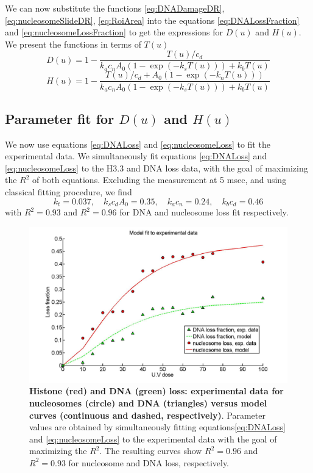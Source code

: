 \documentclass[12pt]{article}
\begin{document}
	We can now substitute the functions \eqref{eq:DNADamageDR}, \eqref{eq:nucleosomeSlideDR}, \eqref{eq:RoiArea} into the equations \eqref{eq:DNALossFraction} and \eqref{eq:nucleosomeLossFraction} to get the expressions for $D(u)$ and $H(u)$. We present the functions in terms of $T(u)$
	\begin{equation}\label{eq:DNALoss}
	D(u) = 1- \frac{T(u)/c_d}{k_ac_nA_0\left(1-\exp\left(-k_sT(u)\right)\right)+k_bT(u)} 	\end{equation}
	\begin{equation}\label{eq:nucleosomeLoss}
		H(u) = 1-\frac{T(u)/c_d+A_0\left(1-\exp\left(-k_nT(u)\right)\right)}{k_ac_nA_0\left(1-\exp\left(-k_sT(u)\right)\right)+k_bT(u)}
	\end{equation}
	
	\subsection{Parameter fit for $D(u)$ and $H(u)$}\label{subsection:parameterFit}
	We now use equations \eqref{eq:DNALoss}  and \eqref{eq:nucleosomeLoss} to fit the experimental data. We simultaneously fit equations \eqref{eq:DNALoss}  and \eqref{eq:nucleosomeLoss} to the H3.3 and DNA loss data, with the goal of maximizing the $R^2$ of both equations. Excluding the measurement at 5 msec, and using classical fitting procedure, we find
	\begin{equation*}
	k_t = 0.037, \quad k_sc_dA_0 = 0.35,\quad k_ac_n = 0.24, \quad k_bc_d = 0.46
	\end{equation*}
	with $R^2 = 0.93$ and $R^2 = 0.96$ for DNA and nucleosome loss fit respectively.
	
	
\begin{figure}[H]
\centering
\includegraphics[width=0.5\linewidth, height=0.3\textheight]{histoneAndDnaVsUvDoseModelFit}
\caption{\textbf{Histone (red) and DNA (green) loss: experimental data
	for nucleosomes (circle) and DNA (triangles) versus model curves
	(continuous and dashed, respectively)}. Parameter values are obtained
	by simultaneously fitting equations\eqref{eq:DNALoss}  and \eqref{eq:nucleosomeLoss} to the experimental data with
	the goal of maximizing the $R^2$. The resulting curves show $R^2 = 0.96$ and
	$R^2 = 0.93$ for nucleosome and DNA loss, respectively.}
\label{fig:histoneAndDnaVsUvDoseModelFit}
\end{figure}
\end{document}
